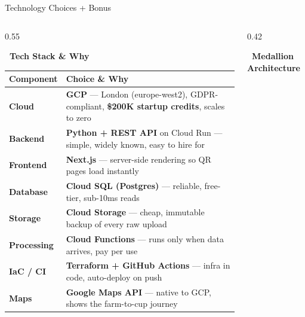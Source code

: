 \documentclass[aspectratio=169]{beamer}
\begin{document}
\begin{frame}{Technology Choices + Bonus}

\begin{columns}[T]

\begin{column}{0.55\textwidth}

\textbf{\faTools\ Tech Stack \& Why}

\vspace{0.2em}
{\scriptsize
\begin{tabular}{p{1.4cm} p{4.8cm}}
    \toprule
    \textbf{Component} & \textbf{Choice \& Why} \\
    \midrule
    \textbf{Cloud} & \textbf{GCP} — London (europe-west2), GDPR-compliant, \textcolor{kahawaGreen}{\textbf{\$200K startup credits}}, scales to zero \\
    \textbf{Backend} & \textbf{Python + REST API} on Cloud Run — simple, widely known, easy to hire for \\
    \textbf{Frontend} & \textbf{Next.js} — server-side rendering so QR pages load instantly \\
    \textbf{Database} & \textbf{Cloud SQL (Postgres)} — reliable, free-tier, sub-10ms reads \\
    \textbf{Storage} & \textbf{Cloud Storage} — cheap, immutable backup of every raw upload \\
    \textbf{Processing} & \textbf{Cloud Functions} — runs only when data arrives, pay per use \\
    \textbf{IaC / CI} & \textbf{Terraform + GitHub Actions} — infra in code, auto-deploy on push \\
    \textbf{Maps} & \textbf{Google Maps API} — native to GCP, shows the farm-to-cup journey \\
    \bottomrule
\end{tabular}
}

\end{column}

\begin{column}{0.42\textwidth}

\textbf{\faLayerGroup\ Medallion Architecture}

\vspace{0.1em}
\end{column}
\end{columns}
\end{frame}
\end{document}

